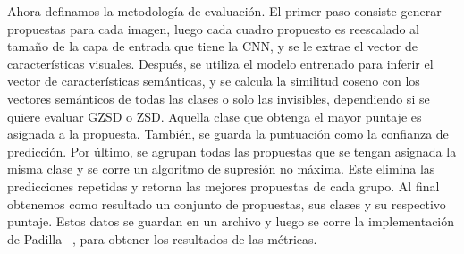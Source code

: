 Ahora definamos la metodología de evaluación. El primer paso consiste generar propuestas para cada imagen, luego cada cuadro propuesto es reescalado al tamaño de la capa de entrada que tiene la CNN, y se le extrae el vector de características visuales. Después, se utiliza el modelo entrenado para inferir el vector de características semánticas, y se calcula la similitud coseno con los vectores semánticos de todas las clases o solo las invisibles, dependiendo si se quiere evaluar GZSD o ZSD. Aquella clase que obtenga el mayor puntaje es asignada a la propuesta. También, se guarda la puntuación como la confianza de predicción.  Por último, se agrupan todas las propuestas que se tengan asignada la misma clase y se corre un algoritmo de supresión no máxima. Este elimina las predicciones repetidas y retorna las mejores propuestas de cada grupo. Al final obtenemos como resultado un conjunto de propuestas, sus clases y su respectivo puntaje. Estos datos se guardan en un archivo y luego se corre la implementación de Padilla \etal~\cite{padilla2020survey}, para obtener los resultados de las métricas.\\
